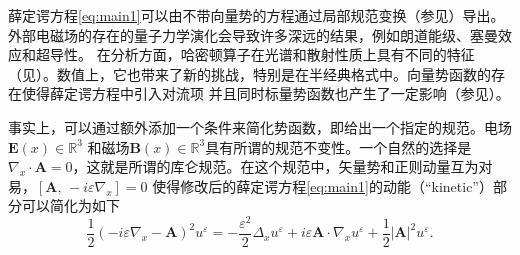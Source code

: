 薛定谔方程\eqref{eq:main1}可以由不带向量势的方程通过局部规范变换（参见）导出。外部电磁场的存在的量子力学演化会导致许多深远的结果，例如朗道能级、塞曼效应和超导性。
在分析方面，哈密顿算子在光谱和散射性质上具有不同的特征（见）。数值上，它也带来了新的挑战，特别是在半经典格式中。向量势函数的存在使得薛定谔方程中引入对流项
并且同时标量势函数也产生了一定影响（参见）。


事实上，可以通过额外添加一个条件来简化势函数，即给出一个指定的规范。电场$\mathbf{E}(x)\in\mathbb{R}^{3}$
和磁场$\mathbf{B}(x)\in\mathbb{R}^{3}$具有所谓的规范不变性。一个自然的选择是$\nabla_{x}\cdot\mathbf{A}=0$，这就是所谓的库仑规范。在这个规范中，矢量势和正则动量互为对易，$[\mathbf{A},\,-i\varepsilon\nabla_x]=0$
使得修改后的薛定谔方程\eqref{eq:main1}的动能（``kinetic''）部分可以简化为如下
\begin{equation}\label{eq:reform}
\frac{1}{2}(-i\varepsilon\nabla_{x}-\mathbf{A})^{2}u^{\varepsilon}=-\frac{\varepsilon^{2}}{2}\Delta_{x}u^{\varepsilon}+i\varepsilon\mathbf{A}\cdot\nabla_{x}u^{\varepsilon}+\frac{1}{2}|\mathbf{A}|^{2}u^{\varepsilon}.
\end{equation}


